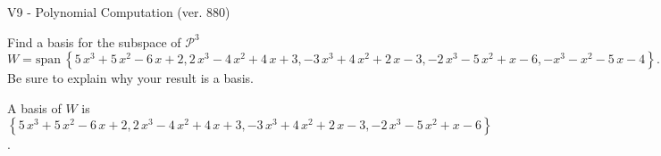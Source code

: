 \begin{exercise}
  \begin{exerciseTitle}V9 - Polynomial Computation (ver. 880)\end{exerciseTitle}
  \begin{exerciseStatement}
    Find a basis for the subspace of \(\mathcal{P}^3\) 
\[W=\mathrm{span}\ \left\{5 \, x^{3} + 5 \, x^{2} - 6 \, x + 2 , 2 \, x^{3} - 4 \, x^{2} + 4 \, x + 3 , -3 \, x^{3} + 4 \, x^{2} + 2 \, x - 3 , -2 \, x^{3} - 5 \, x^{2} + x - 6 , -x^{3} - x^{2} - 5 \, x - 4\right\}.\]
 Be sure to explain why your result is a basis.


  \end{exerciseStatement}
  \begin{exerciseAnswer}
   A basis of \(W\) is  \(\left\{5 \, x^{3} + 5 \, x^{2} - 6 \, x + 2 , 2 \, x^{3} - 4 \, x^{2} + 4 \, x + 3 , -3 \, x^{3} + 4 \, x^{2} + 2 \, x - 3 , -2 \, x^{3} - 5 \, x^{2} + x - 6\right\}\).
  


  \end{exerciseAnswer}
\end{exercise}